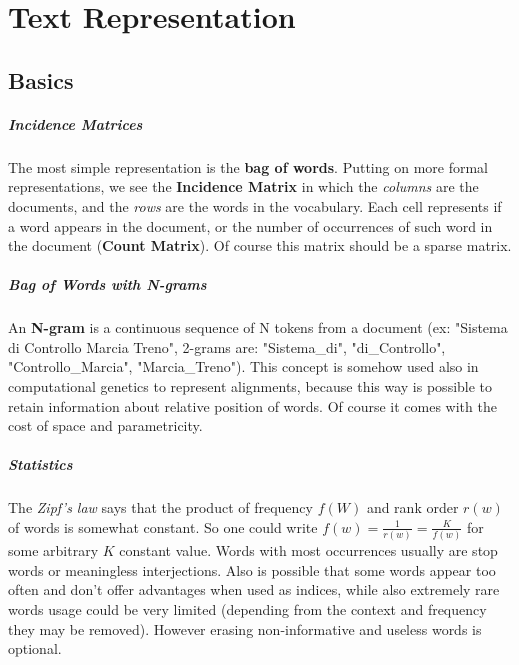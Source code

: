 \chapter{Text Representation}

\section{Basics}

\paragraph{Incidence Matrices}

The most simple representation is the \textbf{bag of words}. Putting on more formal representations, we see the \textbf{Incidence Matrix} in which the \textit{columns} are the documents, and the \textit{rows} are the words in the vocabulary. Each cell represents if a word appears in the document, or the number of occurrences of such word in the document (\textbf{Count Matrix}). Of course this matrix should be a sparse matrix.

\paragraph{Bag of Words with N-grams}

An \textbf{N-gram} is a continuous sequence of N tokens from a document (ex: "Sistema di Controllo Marcia Treno", 2-grams are: "Sistema\_di", "di\_Controllo", "Controllo\_Marcia", "Marcia\_Treno").
This concept is somehow used also in computational genetics to represent alignments, because this way is possible to retain information about relative position of words.
Of course it comes with the cost of space and parametricity.

\paragraph{Statistics}

The \textit{Zipf's law} says that the product of frequency $f(W)$ and rank order $r(w)$ of words is somewhat constant.
So one could write $f(w) = \frac 1 {r(w)} = \frac K {f(w)}$ for some arbitrary $K$ constant value.
Words with most occurrences usually are stop words or meaningless interjections.
Also is possible that some words appear too often and don't offer advantages when used as indices, while also extremely rare words usage could be very limited (depending from the context and frequency they may be removed).
However erasing non-informative and useless words is optional.

